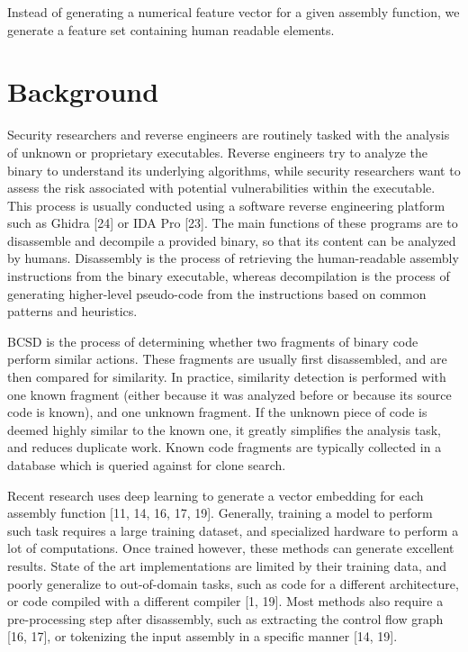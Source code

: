 \documentclass[conference,compsoc]{IEEEtran}
\begin{document}
Instead of generating a numerical feature vector for a given assembly function, we generate a feature set containing
human readable elements.

\section{Background}

Security researchers and reverse engineers are routinely tasked with the analysis of unknown or proprietary executables.
Reverse engineers try to analyze the binary to understand its underlying algorithms, while security researchers want to assess
the risk associated with potential vulnerabilities within the executable. This process is usually conducted using
a software reverse engineering platform such as Ghidra [24] or IDA Pro [23]. The main functions of these programs are to
disassemble and decompile a provided binary, so that its content can be analyzed by humans. Disassembly is
the process of retrieving the human-readable assembly instructions from the binary executable, whereas decompilation
is the process of generating higher-level pseudo-code from the instructions based on common patterns and heuristics.

BCSD is the process of determining whether two fragments of binary code perform similar actions.
These fragments are usually first disassembled, and are then compared for similarity. In practice,
similarity detection is performed with one known fragment (either because it was analyzed before
or because its source code is known), and one unknown fragment. If the unknown piece of code is deemed
highly similar to the known one, it greatly simplifies the analysis task, and reduces duplicate work. Known
code fragments are typically collected in a database which is queried against for clone search.

Recent research uses deep learning to generate a vector embedding for each assembly function [11, 14, 16, 17, 19].
Generally, training a model to perform such task requires a large training dataset, and specialized
hardware to perform a lot of computations. Once trained however, these methods can generate excellent results.
State of the art implementations are limited by their training data, and poorly generalize to out-of-domain tasks,
such as code for a different architecture, or code compiled with a different compiler [1, 19]. Most methods also require
a pre-processing step after disassembly, such as extracting the control flow graph [16, 17], or tokenizing the input
assembly in a specific manner [14, 19].
\end{document}

